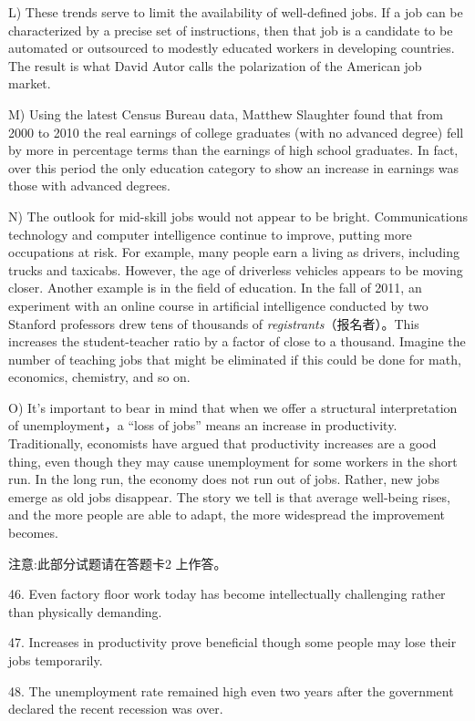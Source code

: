 \documentclass[UTF8,11pt]{ctexart}
\begin{document}
L) These trends serve to limit the availability of well-defined jobs. If a job can be characterized by a precise set of instructions, then that job is a candidate to be automated or outsourced to modestly educated workers in developing countries. The result is what David Autor calls the polarization of the American job market.


M) Using the latest Census Bureau data, Matthew Slaughter found that from 2000 to 2010 the real earnings of college graduates (with no advanced degree) fell by more in percentage terms than the earnings of high school graduates. In fact, over this period the only education category to show an increase in earnings was those with advanced degrees.


N) The outlook for mid-skill jobs would not appear to be bright. Communications technology and computer intelligence continue to improve, putting more occupations at risk. For example, many people earn a living as drivers, including trucks and taxicabs. However, the age of driverless vehicles appears to be moving closer. Another example is in the field of education. In the fall of 2011, an experiment with an online course in artificial intelligence conducted by two Stanford professors drew tens of thousands of\textit{ registrants}（报名者）。This increases the student-teacher ratio by a factor of close to a thousand. Imagine the number of teaching jobs that might be eliminated if this could be done for math, economics, chemistry, and so on.


O) It’s important to bear in mind that when we offer a structural interpretation of unemployment，a “loss of jobs” means an increase in productivity. Traditionally, economists have argued that productivity increases are a good thing, even though they may cause unemployment for some workers in the short run. In the long run, the economy does not run out of jobs. Rather, new jobs emerge as old jobs disappear. The story we tell is that average well-being rises, and the more people are able to adapt, the more widespread the improvement becomes.


注意:此部分试题请在答题卡2 上作答。


46. Even factory floor work today has become intellectually challenging rather than physically demanding.


47. Increases in productivity prove beneficial though some people may lose their jobs temporarily.


48. The unemployment rate remained high even two years after the government declared the recent recession was over.
\end{document}
